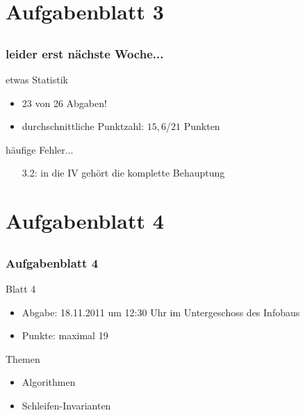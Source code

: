 \section[Blatt 3]{Aufgabenblatt 3}
\subsection*{}
\begin{frame}
	\frametitle{leider erst nächste Woche...}
	\begin{block}{etwas Statistik}
		\begin{itemize}
			\item 23 von 26 Abgaben!
			\item durchschnittliche Punktzahl: $15,6$/$21$ Punkten 
		\end{itemize}
	\end{block}

	\begin{block}{häufige Fehler...}
		\begin{itemize}
			\item[3.2:] in die IV gehört die komplette Behauptung
		 \end{itemize}
	\end{block}
\end{frame}

\section[Blatt 4]{Aufgabenblatt 4}
\subsection*{}
\begin{frame}
        \frametitle{Aufgabenblatt 4}
        \begin{block}{Blatt 4}
					\begin{itemize}
						\item Abgabe: 18.11.2011 um 12:30 Uhr im Untergeschoss des Infobaus
						\item Punkte: maximal 19
					\end{itemize}
        \end{block}
        \begin{block}{Themen}
        \begin{itemize}
            \item Algorithmen
          	\item Schleifen-Invarianten
        \end{itemize}
        \end{block}
\end{frame}
